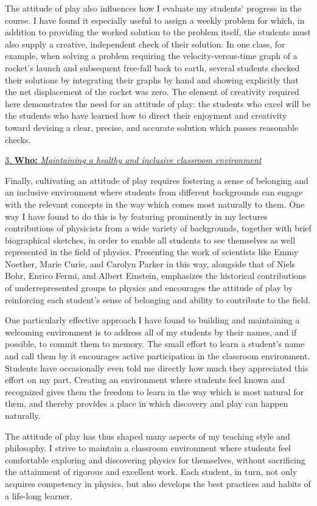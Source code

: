 \documentclass[12pt, tightenlines, onecolumn, showpacs, amsfonts, aps, prc, nofootinbib, floatfix]{revtex4-2}
\begin{document}
\medskip

	The attitude of play also influences how I evaluate my students' progress in the course.  I have found it especially useful to assign a weekly problem for which, in addition to providing the worked solution to the problem itself, the students must also supply a creative, independent check of their solution.  In one class, for example, when solving a problem requiring the velocity-versus-time graph of a rocket's launch and subsequent free-fall back to earth, several students checked their solutions by integrating their graphs by hand and showing explicitly that the net displacement of the rocket was zero.  The element of creativity required here demonstrates the need for an attitude of play: the students who excel will be the students who have learned how to direct their enjoyment and creativity toward devising a clear, precise, and accurate solution which passes reasonable checks.  
	
\medskip

\noindent \underline{3. \textbf{Who:} \textit{Maintaining a healthy and inclusive classroom environment}}

\medskip

Finally, cultivating an attitude of play requires fostering a sense of belonging and an inclusive environment where students from different backgrounds can engage with the relevant concepts in the way which comes most naturally to them.  One way I have found to do this is by featuring prominently in my lectures contributions of physicists from a wide variety of backgrounds, together with brief biographical sketches, in order to enable all students to see themselves as well represented in the field of physics.  Presenting the work of scientists like Emmy Noether, Marie Curie, and Carolyn Parker in this way, alongside that of Niels Bohr, Enrico Fermi, and Albert Einstein, emphasizes the historical contributions of underrepresented groups to physics and encourages the attitude of play by reinforcing each student's sense of belonging and ability to contribute to the field.

\medskip

One particularly effective approach I have found to building and maintaining a welcoming environment is to address all of my students by their names, and if possible, to commit them to memory.  The small effort to learn a student's name and call them by it encourages active participation in the classroom environment.  Students have occasionally even told me directly how much they appreciated this effort on my part.  Creating an environment where students feel known and recognized gives them the freedom to learn in the way which is most natural for them, and thereby provides a place in which discovery and play can happen naturally.

\medskip

The attitude of play has thus shaped many aspects of my teaching style and philosophy.  I strive to maintain a classroom environment where students feel comfortable exploring and discovering physics for themselves, without sacrificing the attainment of rigorous and excellent work.  Each student, in turn, not only acquires competency in physics, but also develops the best practices and habits of a life-long learner.
\end{document}
